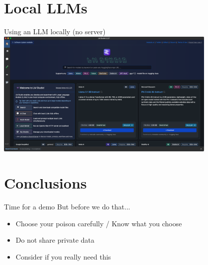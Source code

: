 \documentclass[t,xcolor={dvipsnames},final,aspectratio=169]{beamer}
\begin{document}
\section{Local LLMs}

{
\begin{frame}{Using an LLM locally (no server)}
\includegraphics[width=0.8\textwidth]{img/lmstudio.png}
\end{frame}
}

\section{Conclusions}
\begin{frame}{Time for a demo}
But before we do that...
\begin{itemize}
\item Choose your poison carefully / Know what you choose
\item Do not share private data
\item Consider if you really need this
\end{itemize}
\end{frame}
\end{document}
